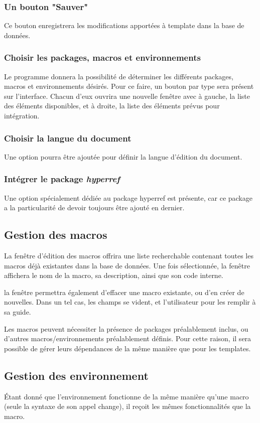 \documentclass[a4paper, oneside]{article}
\begin{document}
\subsubsection{Un bouton "Sauver"}
\label{sec:org4dd5b47}
Ce bouton enregistrera les modifications apportées à template dans la base de
données.
\subsubsection{Choisir les packages, macros et environnements}
\label{sec:org3668976}
Le programme donnera la possibilité de déterminer les différents
packages, macros et environnements désirés. Pour ce faire, un bouton
par type sera présent sur l'interface. Chacun d'eux ouvrira une
nouvelle fenêtre avec à gauche, la liste des éléments disponibles, et
à droite, la liste des éléments prévus pour intégration.
\subsubsection{Choisir la langue du document}
\label{sec:orgb7ad1cb}
Une option pourra être ajoutée pour définir la langue d'édition du document.
\subsubsection{Intégrer le package \emph{hyperref}}
\label{sec:org7d56928}
Une option spécialement dédiée au package hyperref est présente, car
ce package a la particularité de devoir toujours être ajouté en
dernier.
\subsection{Gestion des macros}
\label{sec:org5688fb4}
La fenêtre d'édition des macros offrira une liste recherchable contenant toutes
les macros déjà existantes dans la base de données. Une fois sélectionnée, la
fenêtre affichera le nom de la macro, sa description, ainsi que son code
interne.

la fenêtre permettra également d'effacer une macro existante, ou d'en créer de
nouvelles. Dans un tel cas, les champs se vident, et l'utilisateur pour les
remplir à sa guide.

Les macros peuvent nécessiter la présence de packages préalablement
inclus, ou d'autres macros/environnements préalablement définis. Pour cette
raison, il sera possible de gérer leurs dépendances de la même manière que pour
les templates.
\subsection{Gestion des environnement}
\label{sec:org538abb6}
Étant donné que l'environnement fonctionne de la même manière qu'une macro (seule la
syntaxe de son appel change), il reçoit les mêmes fonctionnalités que la macro.
\end{document}
